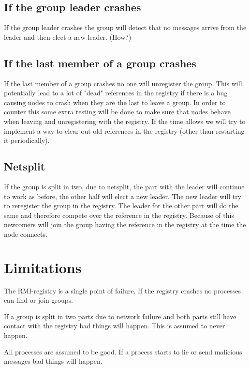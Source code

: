 \documentclass[11pt,swedish]{article}
\begin{document}
\subsection{If the group leader crashes}
If the group leader crashes the group will detect that no messages arrive from the leader and then elect a new leader. (How?)

\subsection{If the last member of a group crashes}
If the last member of a group crashes no one will unregister the group.
This will potentially lead to a lot of "dead" references in the registry if there is a bug causing nodes to crash when they are the last to leave a group. In order to counter this some extra testing will be done to make sure that nodes behave when leaving and unregistering with the registry.
If the time allows we will try to implement a way to clear out old references in the registry (other than restarting it periodically).

\subsection{Netsplit}
If the group is split in two, due to netsplit, the part with the leader will continue to work as before, the other half will elect a new leader.
The new leader will try to reregister the group in the registry. The leader for the other part will do the same and therefore compete over the reference in the registry. Because of this newcomers will join the group having the reference in the registry at the time the node connects.

\section{Limitations}
The RMI-registry is a single point of failure. If the registry crashes no processes can find or join groups. 

If a group is split in two parts due to network failure and both parts still have contact  with the registry bad things will happen. This is assumed to never happen.

All processes are assumed to be good. If a process starts to lie or send malicious messages bad things will happen.
\end{document}
